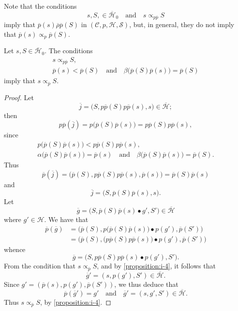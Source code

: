 \documentclass[a4paper,fleqn]{article}
\theoremstyle{plain}
\newenvironment{proposition}[1]
  {\renewcommand\theinnerproposition{#1}\innerproposition}
  {\endinnerproposition}
\theoremstyle{definition}
\newcommand{\textand}{\quad\text{and}\quad}
\newcommand{\CC}{\mathcal{C}}
\newcommand{\HH}{\mathcal{H}}
\newcommand{\bHH}{\overline{\HH}}
\renewcommand{\SS}{\mathcal{S}}
\newcommand{\relrhobar}{\mathrel{\overline{\rho}}}
\newcommand{\subs}{\mathrel{\propto}}
\begin{document}
Note that the conditions
\[
  s,S,\in\bHH_0
  \textand
  s\subs_{p\overline{p}} S
\]
imply that $\overline{p}(s)\relrhobar\overline{p}(S)$ in $(\CC,p,\HH,\SS)$, but, in general, they do not imply that $\overline{p}(s)\subs_p\overline{p}(S)$.

\begin{proposition}{12}
\label{proposition:i-12}
  Let $s,S\in\bHH_0$.
  The conditions
  \[
    \begin{gathered}
      s\subs_{p\overline{p}}S,
    \\\overline{p}(s)<\overline{p}(S)
      \textand
      \beta\big(\overline{p}(S)\overline{p}(s)\big) = \overline{p}(S)
    \end{gathered}
  \]
  imply that $s\subs_{\overline{p}}S$.
\end{proposition}

\begin{proof}
  Let
  \[
    \overline{j}
    = \big(
      S, p\overline{p}(S)p\overline{p}(s), s
    \big) \in \bHH;
  \]
  then
  \[
    p\overline{p}(\overline{j})
    = p\big(
      \overline{p}(S)\overline{p}(s)
    \big)
    = p\overline{p}(S)p\overline{p}(s),
  \]
  since
  \[
    \begin{gathered}
      p\big(
        \overline{p}(S)\overline{p}(s)
      \big) < p\overline{p}(S)p\overline{p}(s),
    \\\alpha\big(
        \overline{p}(S)\overline{p}(s)
      \big) = \overline{p}(s)
      \textand
      \beta\big(
        \overline{p}(S)\overline{p}(s)
      \big) = \overline{p}(S).
    \end{gathered}
  \]
  Thus
  \[
    \overline{p}(\overline{j})
    = \big(
      \overline{p}(S), p\overline{p}(S)p\overline{p}(s), \overline{p}(s)
    \big)
    = \overline{p}(S)\overline{p}(s)
  \]
  and
  \[
    \overline{j}
    =\big(
      S, \overline{p}(S)\overline{p}(s), s
    \big).
  \]
  Let
  \[
    \overline{g}
    = \big(
      S, \overline{p}(S)\overline{p}(s)\bullet g', S'
    \big) \in\bHH
  \]
  where $g'\in\HH$.
  We have that
  \[
    \begin{aligned}
      \overline{p}(\overline{g})
      &= \big(
        \overline{p}(S),
        p\big(\overline{p}(S)\overline{p}(s)\big)\bullet p(g'),
        \overline{p}(S')
      \big)
    \\&= \big(
        \overline{p}(S),
        \big(p\overline{p}(S)p\overline{p}(s)\big)\bullet p(g'),
        \overline{p}(S')
      \big)
    \end{aligned}
  \]
  whence
  \[
    \overline{g}
    = \big(
      S, p\overline{p}(S)p\overline{p}(s)\bullet p(g'), S'
    \big).
  \]
  From the condition that $s\subs_{\overline{p}}S$, and by \cref{proposition:i-4}, it follows that
  \[
    \overline{g}'
    = (s, p(g'), S')
    \in\bHH.
  \]
  Since $g'=(\overline{p}(s),p(g'),\overline{p}(S'))$, we thus deduce that
  \[
    \overline{p}(\overline{g}') = g'
    \textand
    \overline{g}' = (s,g',S') \in \bHH.
  \]
  Thus $s\subs_{\overline{p}}S$, by \cref{proposition:i-4}.
\end{proof}
\end{document}
